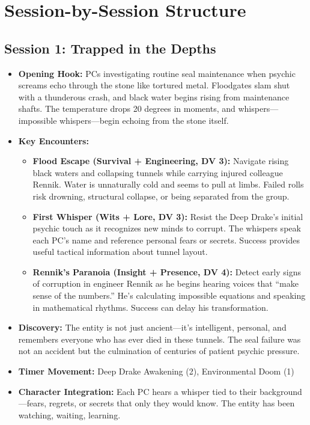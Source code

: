 \documentclass[11pt]{article}
\begin{document}
\section{Session-by-Session Structure}

\subsection{Session 1: Trapped in the Depths}
\begin{itemize}
\item \textbf{Opening Hook:} PCs investigating routine seal maintenance when psychic screams echo through the stone like tortured metal. Floodgates slam shut with a thunderous crash, and black water begins rising from maintenance shafts. The temperature drops 20 degrees in moments, and whispers---impossible whispers---begin echoing from the stone itself.
\item \textbf{Key Encounters:}
  \begin{itemize}
  \item \textbf{Flood Escape (Survival + Engineering, DV 3):} Navigate rising black waters and collapsing tunnels while carrying injured colleague Rennik. Water is unnaturally cold and seems to pull at limbs. Failed rolls risk drowning, structural collapse, or being separated from the group.
  \item \textbf{First Whisper (Wits + Lore, DV 3):} Resist the Deep Drake's initial psychic touch as it recognizes new minds to corrupt. The whispers speak each PC's name and reference personal fears or secrets. Success provides useful tactical information about tunnel layout.
  \item \textbf{Rennik's Paranoia (Insight + Presence, DV 4):} Detect early signs of corruption in engineer Rennik as he begins hearing voices that ``make sense of the numbers.'' He's calculating impossible equations and speaking in mathematical rhythms. Success can delay his transformation.
  \end{itemize}
\item \textbf{Discovery:} The entity is not just ancient---it's intelligent, personal, and remembers everyone who has ever died in these tunnels. The seal failure was not an accident but the culmination of centuries of patient psychic pressure.
\item \textbf{Timer Movement:} Deep Drake Awakening (2), Environmental Doom (1)
\item \textbf{Character Integration:} Each PC hears a whisper tied to their background---fears, regrets, or secrets that only they would know. The entity has been watching, waiting, learning.
\end{itemize}
\end{document}
